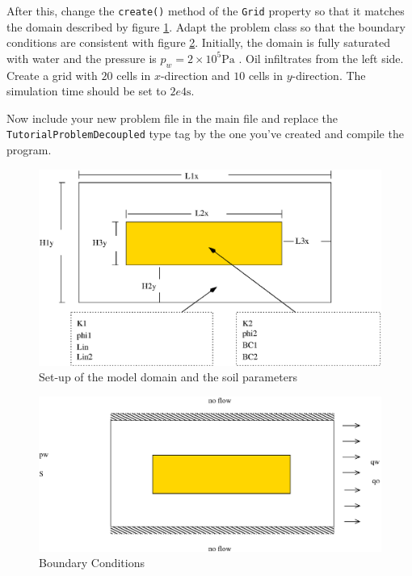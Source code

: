After this, change the \texttt{create()} method of the \texttt{Grid}
property so that it matches the domain described
by figure \ref{tutorial-decoupled:ex2_Domain}. Adapt the problem class
so that the boundary conditions are consistent with figure
\ref{tutorial-decoupled:ex2_BC}. Initially, the domain is fully saturated
with water and the pressure is $p_w = 2 \times 10^5 \text{Pa}$ . Oil
infiltrates from the left side. Create a grid with $20$ cells in
$x$-direction and $10$ cells in $y$-direction. The simulation time
should be set to $2e4 \text{s}$.

Now include your new problem file in the main file and replace the
\texttt{TutorialProblemDecoupled} type tag by the one you've created and
compile the program.


\begin{figure}[h]
\centering
\includegraphics[width=0.8\linewidth,keepaspectratio]{EPS/Ex2_Domain.eps}
\caption{Set-up of the model domain and the soil parameters}\label{tutorial-decoupled:ex2_Domain}
\end{figure}

\begin{figure}[h]
\centering
\includegraphics[width=0.8\linewidth,keepaspectratio]{EPS/Ex2_Boundary.eps}
\caption{Boundary Conditions}\label{tutorial-decoupled:ex2_BC}
\end{figure}


